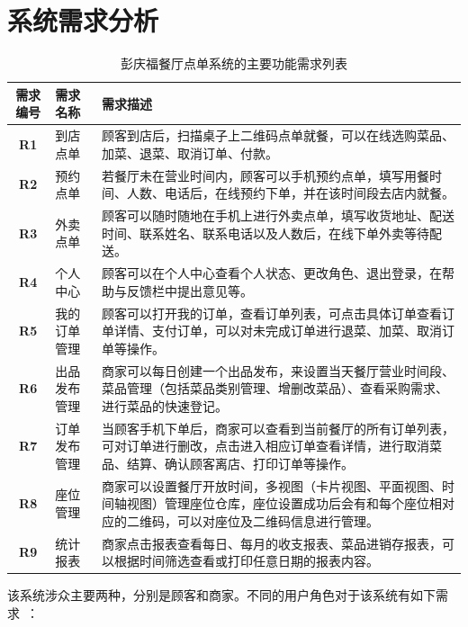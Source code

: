 \section{系统需求分析}
\begin{table}[htbp!]\footnotesize
  \centering
  \caption{彭庆福餐厅点单系统的主要功能需求列表}
  \vspace{2mm}
  \begin{tabular}{clp{}}
  \toprule
  \textbf{需求编号}&\textbf{需求名称}&\textbf{需求描述}\\
  \midrule 
  \textbf{R1}& 到店点单& 顾客到店后，扫描桌子上二维码点单就餐，可以在线选购菜品、加菜、退菜、取消订单、付款。\\
  \hline
  \textbf{R2}& 预约点单& 若餐厅未在营业时间内，顾客可以手机预约点单，填写用餐时间、人数、电话后，在线预约下单，并在该时间段去店内就餐。\\
  \hline
  \textbf{R3}& 外卖点单& 顾客可以随时随地在手机上进行外卖点单，填写收货地址、配送时间、联系姓名、联系电话以及人数后，在线下单外卖等待配送。\\
  \hline
  \textbf{R4}& 个人中心& 顾客可以在个人中心查看个人状态、更改角色、退出登录，在帮助与反馈栏中提出意见等。\\
  \hline
  \textbf{R5}& 我的订单管理& 顾客可以打开我的订单，查看订单列表，可点击具体订单查看订单详情、支付订单，可以对未完成订单进行退菜、加菜、取消订单等操作。\\
  \hline
  \textbf{R6}& 出品发布管理& 商家可以每日创建一个出品发布，来设置当天餐厅营业时间段、菜品管理（包括菜品类别管理、增删改菜品）、查看采购需求、进行菜品的快速登记。\\
  \hline
  \textbf{R7}& 订单发布管理& 当顾客手机下单后，商家可以查看到当前餐厅的所有订单列表，可对订单进行删改，点击进入相应订单查看详情，进行取消菜品、结算、确认顾客离店、打印订单等操作。\\
  \hline
  \textbf{R8}& 座位管理& 商家可以设置餐厅开放时间，多视图（卡片视图、平面视图、时间轴视图）管理座位仓库，座位设置成功后会有和每个座位相对应的二维码，可以对座位及二维码信息进行管理。\\
  \hline
  \textbf{R9}& 统计报表& 商家点击报表查看每日、每月的收支报表、菜品进销存报表，可以根据时间筛选查看或打印任意日期的报表内容。\\
  \bottomrule
  \end{tabular}
  \label{table:requireList}
\end{table}

该系统涉众主要两种，分别是顾客和商家。不同的用户角色对于该系统有如下需求~\cite{lb2009}：

